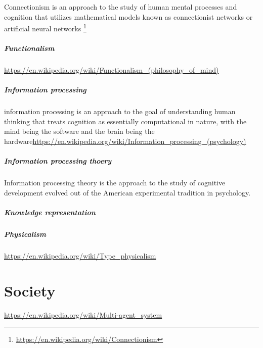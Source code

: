 \documentclass{book}
\providecommand{\seeherefooter}[1]{\footnote{\url{#1}}}
\begin{document}
Connectionism is an approach to the study of human mental processes and cognition that utilizes mathematical models known as connectionist networks or artificial neural networks \seeherefooter{https://en.wikipedia.org/wiki/Connectionism}

\subparagraph{Functionalism}


\url{https://en.wikipedia.org/wiki/Functionalism_(philosophy_of_mind)}

\subparagraph{Information processing}


information processing is an approach to the goal of understanding human thinking that treats cognition as essentially computational in nature, with the mind being the software and the brain being the hardware\url{https://en.wikipedia.org/wiki/Information_processing_(psychology)}

\subparagraph{Information processing thoery}


Information processing theory is the approach to the study of cognitive development evolved out of the American experimental tradition in psychology.

\subparagraph{Knowledge representation}


%

\subparagraph{Physicalism}


\url{https://en.wikipedia.org/wiki/Type_physicalism}

\section{Society}


\url{https://en.wikipedia.org/wiki/Multi-agent_system}
    
\end{document}
